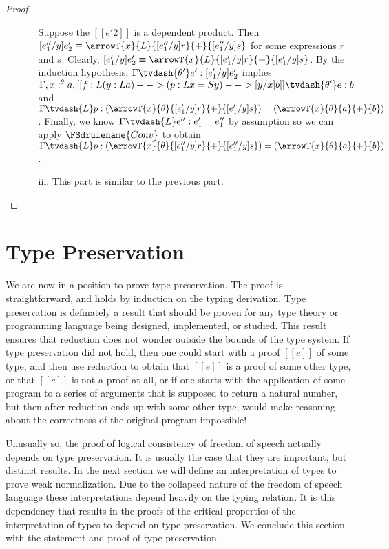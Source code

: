 \begin{proof}
\begin{itemize}
\begin{itemize}
      Suppose the $[[e'2]]$ is a dependent product.  Then 
      $[e''_1/y]e'_2 \equiv \arrowT{x}{L}{[e''_1/y]r}{+}{[e''_1/y]s}$ for some
      expressions $r$ and $s$.  Clearly, $[e'_1/y]e'_2 \equiv
      \arrowT{x}{L}{[e'_1/y]r}{+}{[e'_1/y]s}$.  By the induction
      hypothesis, $\Gamma \tvdash{\theta'} e':[e'_1/y]e'_2$ implies
      $\Gamma,x:^\theta a, [[f : L (y : L a)+ -> (p : L x = S y)- -> [y/x]b]] \tvdash{\theta'} e:b$ and 
      $\Gamma \tvdash{L} p:(\arrowT{x}{\theta}{[e'_1/y]r}{+}{[e'_1/y]s}) =
      (\arrowT{x}{\theta}{a}{+}{b})$.  Finally, we know $\Gamma \tvdash{L} e'':e'_1 = e''_1$ by assumption
      so we can apply $\FSdrulename{Conv}$ to obtain $\Gamma \tvdash{L} p:(\arrowT{x}{\theta}{[e''_1/y]r}{+}{[e''_1/y]s}) = (\arrowT{x}{\theta}{a}{+}{b})$.

    \item[iii.] This part is similar to the previous part.
    \end{itemize}
  \end{itemize}
\end{proof}

\section{Type Preservation}
\label{sec:type_preservation}
We are now in a position to prove type preservation.  The proof is
straightforward, and holds by induction on the typing derivation.
Type preservation is definately a result that should be proven for any
type theory or programming language being designed, implemented, or
studied.  This result ensures that reduction does not wonder outside
the bounds of the type system.  If type preservation did not hold,
then one could start with a proof $[[e]]$ of some type, and then use
reduction to obtain that $[[e]]$ is a proof of some other type, or that
$[[e]]$ is not a proof at all, or if one starts with the application
of some program to a series of arguments that is supposed to return a
natural number, but then after reduction ends up with some other type,
would make reasoning about the correctness of the original program
impossible!

Unusually so, the proof of logical consistency of freedom of speech
actually depends on type preservation.  It is usually the case that
they are important, but distinct results.  In the next section we will
define an interpretation of types to prove weak normalization.  Due to
the collapsed nature of the freedom of speech language these
interpretations depend heavily on the typing relation. It is this
dependency that results in the proofs of the critical properties of
the interpretation of types to depend on type preservation.  We
conclude this section with the statement and proof of type
preservation.
 
